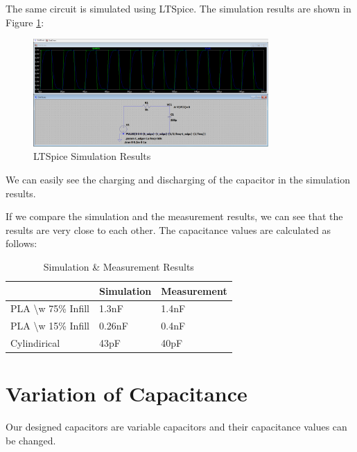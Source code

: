 The same circuit is simulated using LTSpice. The simulation results are shown in Figure \ref{fig:ltspice-simulation}:

\begin{figure}[h]
    \centering
    \includegraphics[width=0.8\textwidth]{assets/1714059734.png}
    \caption{LTSpice Simulation Results}
    \label{fig:ltspice-simulation}
\end{figure}

We can easily see the charging and discharging of the capacitor in the simulation results. 

If we compare the simulation and the measurement results, we can see that the results are very close to each other. The capacitance values are calculated as follows:

\begin{table}[h]
    \centering
    \begin{tabular}{l|l|l|}
    \cline{2-3}
                                                            & Simulation & Measurement \\ \hline
    \multicolumn{1}{|l|}{PLA \textbackslash{}w 75\% Infill} & 1.3nF     & 1.4nF      \\ \hline
    \multicolumn{1}{|l|}{PLA \textbackslash{}w 15\% Infill} & 0.26nF    & 0.4nF      \\ \hline
    \multicolumn{1}{|l|}{Cylindirical} & 43pF     & 40pF       \\ \hline
    \end{tabular}
    \caption{Simulation \& Measurement Results}
\end{table}



\newpage
\thispagestyle{plain}

\section{Variation of Capacitance}

Our designed capacitors are variable capacitors and their capacitance values can be changed. 

